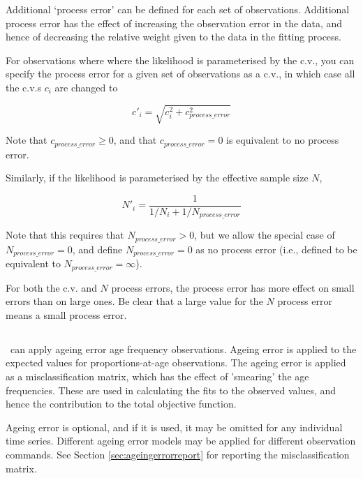 Additional `process error' can be defined for each set of observations. Additional process error has the effect of increasing the observation error in the data, and hence of decreasing the relative weight given to the data in the fitting process. 

For observations where where the likelihood is parameterised by the c.v., you can specify the process error for a given set of observations as a c.v., in which case all the c.v.s $c_i$ are changed to

\begin{equation}
  c'_i  = \sqrt {c_i^2  + c_{process\_error}^2 } 
\end{equation}

Note that $c_{process\_ error} \ge 0$, and that $c_{process\_ error} = 0$ is equivalent to no process error.

Similarly, if the likelihood is parameterised by the effective sample size $N$,

\begin{equation}
 N'_i  = \frac{1}{1 / {N_i}+ 1 / N_{process\_error}}
\end{equation}

Note that this requires that $N_{process\_ error} > 0$, but we allow the special case of $N_{process\_ error}=0$, and define $N_{process\_ error}=0$ as no process error (i.e., defined to be equivalent to $N_{process\_ error}=\infty$). 

For both the c.v. and $N$ process errors, the process error has more effect on small errors than on large ones. Be clear that a large value for the $N$ process error means a small process error.

\subsection{}

\SPM\ can apply ageing error age frequency observations. Ageing error is applied to the expected values for proportions-at-age observations. The ageing error is applied as a misclassification matrix, which has the effect of 'smearing' the age frequencies. These are used in calculating the fits to the observed values, and hence the contribution to the total objective function. 

Ageing error is optional, and if it is used, it may be omitted for any individual time series. Different ageing error models may be applied for different observation commands. See Section \ref{sec:ageingerrorreport} for reporting the misclassification matrix.

